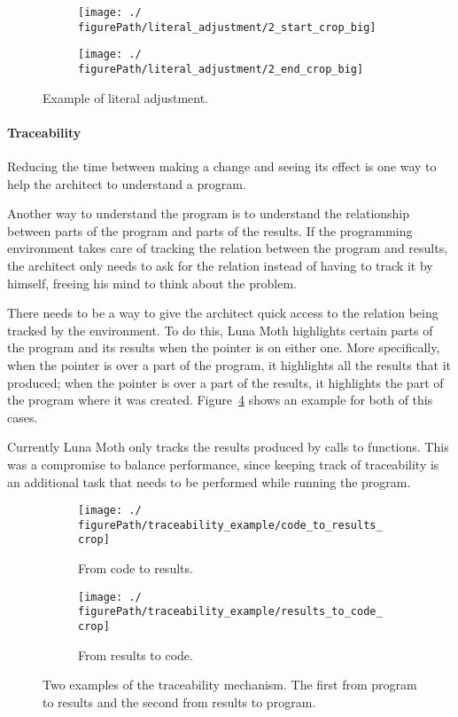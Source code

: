 \begin{figure}
  \centering
  \begin{subfigure}[b]{0.49\linewidth}
    \texttt{[image: ./\\figurePath/literal\_adjustment/2\_start\_crop\_big]}
  \end{subfigure}%
\hspace{0.01\linewidth}%
  \begin{subfigure}[b]{0.49\linewidth}
    \texttt{[image: ./\\figurePath/literal\_adjustment/2\_end\_crop\_big]}
  \end{subfigure}
  \caption{Example of literal adjustment.}
  \label{fig:lit:adjust}
\end{figure}


\paragraph{Traceability}
Reducing the time between making a change and seeing its effect is one way to help the architect to understand a program.

Another way to understand the program is to understand the relationship between parts of the program and parts of the results.
If the programming environment takes care of tracking the relation between the program and results, the architect only needs to ask for the relation instead of having to track it by himself, freeing his mind to think about the problem.

There needs to be a way to give the architect quick access to the relation being tracked by the environment.
To do this, Luna Moth highlights certain parts of the program and its results when the pointer is on either one.
More specifically, when the pointer is over a part of the program, it highlights all the results that it produced;
when the pointer is over a part of the results, it highlights the part of the program where it was created.
Figure~\ref{fig:trace:example} shows an example for both of this cases.

Currently Luna Moth only tracks the results produced by calls to functions.
This was a compromise to balance performance, since keeping track of traceability is an additional task that needs to be performed while running the program.

\begin{figure}
  \centering
  \begin{subfigure}[b]{1.0\linewidth}
    \texttt{[image: ./\\figurePath/traceability\_example/code\_to\_results\_crop]}
    \caption{From code to results.}
    \label{sub:code:to:results}
  \end{subfigure}

  \begin{subfigure}[b]{1.0\linewidth}
    \texttt{[image: ./\\figurePath/traceability\_example/results\_to\_code\_crop]}
    \caption{From results to code.}
    \label{sub:results:to:code}
  \end{subfigure}
  \caption{Two examples of the traceability mechanism. The first from program to results and the second from results to program.}
  \label{fig:trace:example}
\end{figure}


